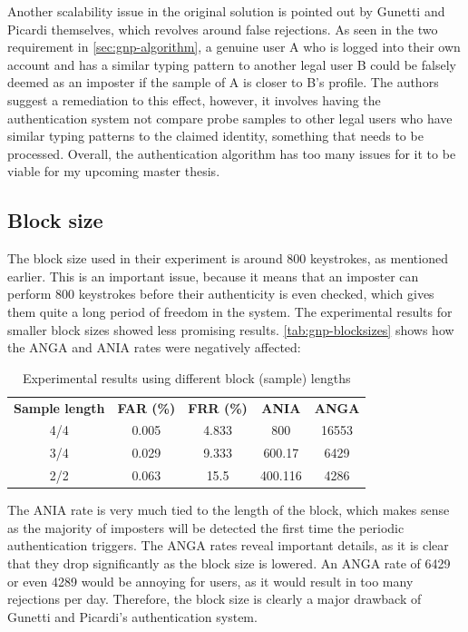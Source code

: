 \documentclass[informationsecurity]{gucmasterproject}
\begin{document}
Another scalability issue in the original solution is pointed out by Gunetti and Picardi themselves, which revolves around false rejections.
As seen in the two requirement in \autoref{sec:gnp-algorithm}, a genuine user A who is logged into their own account and has a similar typing pattern to another legal user B could be falsely deemed as an imposter if the sample of A is closer to B's profile.
The authors suggest a remediation to this effect, however, it involves having the authentication system not compare probe samples to other legal users who have similar typing patterns to the claimed identity, something that needs to be processed.
Overall, the authentication algorithm has too many issues for it to be viable for my upcoming master thesis.

\subsection{Block size}
\label{sec:gnp-blocksizes}
The block size used in their experiment is around 800 keystrokes, as mentioned earlier.
This is an important issue, because it means that an imposter can perform 800 keystrokes before their authenticity is even checked, which gives them quite a long period of freedom in the system.
The experimental results for smaller block sizes showed less promising results. 
\autoref{tab:gnp-blocksizes} shows how the ANGA and ANIA rates were negatively affected:

\begin{table}[h]
\centering
\begin{tabular}{ccccc}
 \bf Sample length & \bf FAR (\%) & \bf FRR (\%) & \bf ANIA & \bf ANGA \\
 4/4 & 0.005 & 4.833 & 800 & 16553 \\
 3/4 & 0.029 & 9.333 & 600.17 & 6429\\
 2/2 & 0.063 & 15.5 & 400.116 & 4286
\end{tabular}
\caption{Experimental results using different block (sample) lengths}
\label{tab:gnp-blocksizes}
\end{table}
The ANIA rate is very much tied to the length of the block, which makes sense as the majority of imposters will be detected the first time the periodic authentication triggers.
The ANGA rates reveal important details, as it is clear that they drop significantly as the block size is lowered.
An ANGA rate of 6429 or even 4289 would be annoying for users, as it would result in too many rejections per day.
Therefore, the block size is clearly a major drawback of Gunetti and Picardi's authentication system.
\end{document}
